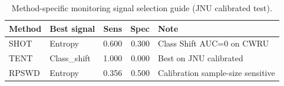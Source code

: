 \begin{table}[!t]
\centering
\footnotesize
\caption{Method-specific monitoring signal selection guide (JNU calibrated test).}
\label{tab:signal}
\begin{tabular}{llrrl}
\toprule
Method & Best signal & Sens & Spec & Note \\
\midrule
SHOT & Entropy & 0.600 & 0.300 & Class Shift AUC=0 on CWRU \\
TENT & Class\_shift & 1.000 & 0.000 & Best on JNU calibrated \\
RPSWD & Entropy & 0.356 & 0.500 & Calibration sample-size sensitive \\
\bottomrule
\end{tabular}
\end{table}
